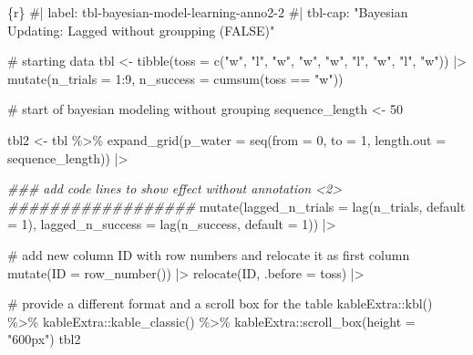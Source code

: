 \documentclass[
  letterpaper,
  DIV=11,
  numbers=noendperiod]{scrreprt}
\newenvironment{Shaded}{\begin{snugshade}}{\end{snugshade}}
\newcommand{\AttributeTok}[1]{\textcolor[rgb]{0.40,0.45,0.13}{#1}}
\newcommand{\CommentTok}[1]{\textcolor[rgb]{0.37,0.37,0.37}{#1}}
\newcommand{\DecValTok}[1]{\textcolor[rgb]{0.68,0.00,0.00}{#1}}
\newcommand{\DocumentationTok}[1]{\textcolor[rgb]{0.37,0.37,0.37}{\textit{#1}}}
\newcommand{\FunctionTok}[1]{\textcolor[rgb]{0.28,0.35,0.67}{#1}}
\newcommand{\InformationTok}[1]{\textcolor[rgb]{0.37,0.37,0.37}{#1}}
\newcommand{\NormalTok}[1]{\textcolor[rgb]{0.00,0.23,0.31}{#1}}
\newcommand{\OtherTok}[1]{\textcolor[rgb]{0.00,0.23,0.31}{#1}}
\newcommand{\SpecialCharTok}[1]{\textcolor[rgb]{0.37,0.37,0.37}{#1}}
\newcommand{\StringTok}[1]{\textcolor[rgb]{0.13,0.47,0.30}{#1}}
\begin{document}
\begin{Shaded}
\begin{Highlighting}[]
\InformationTok{\textasciigrave{}\textasciigrave{}\textasciigrave{}\{r\}}
\CommentTok{\#| label: tbl{-}bayesian{-}model{-}learning{-}anno2{-}2}
\CommentTok{\#| tbl{-}cap: "Bayesian Updating: Lagged without groupping (FALSE)"}

\CommentTok{\# starting data}
\NormalTok{tbl }\OtherTok{\textless{}{-}} \FunctionTok{tibble}\NormalTok{(}\AttributeTok{toss =} \FunctionTok{c}\NormalTok{(}\StringTok{"w"}\NormalTok{, }\StringTok{"l"}\NormalTok{, }\StringTok{"w"}\NormalTok{, }\StringTok{"w"}\NormalTok{, }\StringTok{"w"}\NormalTok{, }\StringTok{"l"}\NormalTok{, }\StringTok{"w"}\NormalTok{, }\StringTok{"l"}\NormalTok{, }\StringTok{"w"}\NormalTok{)) }\SpecialCharTok{|\textgreater{}} 
    \FunctionTok{mutate}\NormalTok{(}\AttributeTok{n\_trials  =} \DecValTok{1}\SpecialCharTok{:}\DecValTok{9}\NormalTok{, }\AttributeTok{n\_success =} \FunctionTok{cumsum}\NormalTok{(toss }\SpecialCharTok{==} \StringTok{"w"}\NormalTok{))}

\CommentTok{\# start of bayesian modeling without grouping}
\NormalTok{sequence\_length }\OtherTok{\textless{}{-}} \DecValTok{50}

\NormalTok{tbl2 }\OtherTok{\textless{}{-}}\NormalTok{ tbl }\SpecialCharTok{\%\textgreater{}\%} 
  \FunctionTok{expand\_grid}\NormalTok{(}\AttributeTok{p\_water =} \FunctionTok{seq}\NormalTok{(}\AttributeTok{from =} \DecValTok{0}\NormalTok{, }\AttributeTok{to =} \DecValTok{1}\NormalTok{, }
                            \AttributeTok{length.out =}\NormalTok{ sequence\_length)) }\SpecialCharTok{|\textgreater{}} 
    
  \DocumentationTok{\#\#\# add code lines to show effect without annotation \textless{}2\textgreater{} \#\#\#\#\#\#\#\#\#\#\#\#\#\#\#\#\#\#}
  \FunctionTok{mutate}\NormalTok{(}\AttributeTok{lagged\_n\_trials  =} \FunctionTok{lag}\NormalTok{(n\_trials, }\AttributeTok{default =} \DecValTok{1}\NormalTok{),}
         \AttributeTok{lagged\_n\_success =} \FunctionTok{lag}\NormalTok{(n\_success, }\AttributeTok{default =} \DecValTok{1}\NormalTok{)) }\SpecialCharTok{|\textgreater{}} 
  
  \CommentTok{\# add new column ID with row numbers and relocate it as first column}
  \FunctionTok{mutate}\NormalTok{(}\AttributeTok{ID =} \FunctionTok{row\_number}\NormalTok{()) }\SpecialCharTok{|\textgreater{}} 
  \FunctionTok{relocate}\NormalTok{(ID, }\AttributeTok{.before =}\NormalTok{ toss) }\SpecialCharTok{|\textgreater{}} 

  \CommentTok{\# provide a different format and a scroll box for the table}
\NormalTok{  kableExtra}\SpecialCharTok{::}\FunctionTok{kbl}\NormalTok{() }\SpecialCharTok{\%\textgreater{}\%}
\NormalTok{  kableExtra}\SpecialCharTok{::}\FunctionTok{kable\_classic}\NormalTok{() }\SpecialCharTok{\%\textgreater{}\%}
\NormalTok{  kableExtra}\SpecialCharTok{::}\FunctionTok{scroll\_box}\NormalTok{(}\AttributeTok{height =} \StringTok{"600px"}\NormalTok{)}
\NormalTok{tbl2}
\InformationTok{\textasciigrave{}\textasciigrave{}\textasciigrave{}}
\end{Highlighting}
\end{Shaded}
\end{document}
